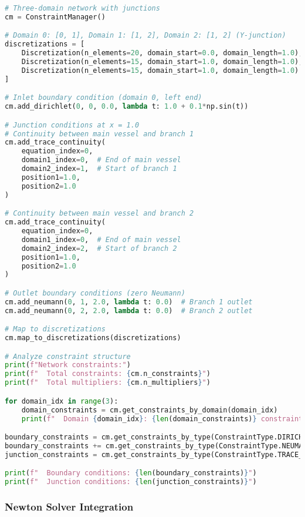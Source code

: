 \begin{lstlisting}[language=Python, caption=Multi-Domain Junction Example]
# Three-domain network with junctions
cm = ConstraintManager()

# Domain 0: [0, 1], Domain 1: [1, 2], Domain 2: [1, 2] (Y-junction)
discretizations = [
    Discretization(n_elements=20, domain_start=0.0, domain_length=1.0),  # Main
    Discretization(n_elements=15, domain_start=1.0, domain_length=1.0),  # Branch 1
    Discretization(n_elements=15, domain_start=1.0, domain_length=1.0)   # Branch 2
]

# Inlet boundary condition (domain 0, left end)
cm.add_dirichlet(0, 0, 0.0, lambda t: 1.0 + 0.1*np.sin(t))

# Junction conditions at x = 1.0
# Continuity between main vessel and branch 1
cm.add_trace_continuity(
    equation_index=0,
    domain1_index=0,  # End of main vessel
    domain2_index=1,  # Start of branch 1
    position1=1.0,
    position2=1.0
)

# Continuity between main vessel and branch 2
cm.add_trace_continuity(
    equation_index=0,
    domain1_index=0,  # End of main vessel
    domain2_index=2,  # Start of branch 2
    position1=1.0,
    position2=1.0
)

# Outlet boundary conditions (zero Neumann)
cm.add_neumann(0, 1, 2.0, lambda t: 0.0)  # Branch 1 outlet
cm.add_neumann(0, 2, 2.0, lambda t: 0.0)  # Branch 2 outlet

# Map to discretizations
cm.map_to_discretizations(discretizations)

# Analyze constraint structure
print(f"Network constraints:")
print(f"  Total constraints: {cm.n_constraints}")
print(f"  Total multipliers: {cm.n_multipliers}")

for domain_idx in range(3):
    domain_constraints = cm.get_constraints_by_domain(domain_idx)
    print(f"  Domain {domain_idx}: {len(domain_constraints)} constraints")

boundary_constraints = cm.get_constraints_by_type(ConstraintType.DIRICHLET)
boundary_constraints += cm.get_constraints_by_type(ConstraintType.NEUMANN)
junction_constraints = cm.get_constraints_by_type(ConstraintType.TRACE_CONTINUITY)

print(f"  Boundary conditions: {len(boundary_constraints)}")
print(f"  Junction conditions: {len(junction_constraints)}")
\end{lstlisting}

\subsubsection{Newton Solver Integration}

